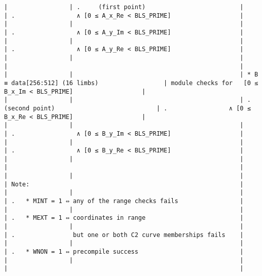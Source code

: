 \documentclass[varwidth=\maxdimen,margin=0.5cm,multi={verbatim}]{standalone}
\begin{document}
\begin{verbatim}
|                 | .     (first point)                          |                                                 | .                 ∧ [0 ≤ A_x_Re < BLS_PRIME]                   |
|                 |                                              |                                                 | .                 ∧ [0 ≤ A_y_Im < BLS_PRIME]                   |
|                 |                                              |                                                 | .                 ∧ [0 ≤ A_y_Re < BLS_PRIME]                   |
|                 |                                              |                                                 |                                                                |
|                 |                                              | * B ≡ data[256:512] (16 limbs)                  | module checks for   [0 ≤ B_x_Im < BLS_PRIME]                   |
|                 |                                              | .     (second point)                            | .                 ∧ [0 ≤ B_x_Re < BLS_PRIME]                   |
|                 |                                              |                                                 | .                 ∧ [0 ≤ B_y_Im < BLS_PRIME]                   |
|                 |                                              |                                                 | .                 ∧ [0 ≤ B_y_Re < BLS_PRIME]                   |
|                 |                                              |                                                 |                                                                |
|                 |                                              |                                                 | Note:                                                          |
|                 |                                              |                                                 | .   * MINT = 1 ⇔ any of the range checks fails                 |
|                 |                                              |                                                 | .   * MEXT = 1 ⇔ coordinates in range                          |
|                 |                                              |                                                 | .                but one or both C2 curve memberships fails    |
|                 |                                              |                                                 | .   * WNON = 1 ⇔ precompile success                            |
|                 |                                              |                                                 |                                                                |

\end{verbatim}
\end{document}

